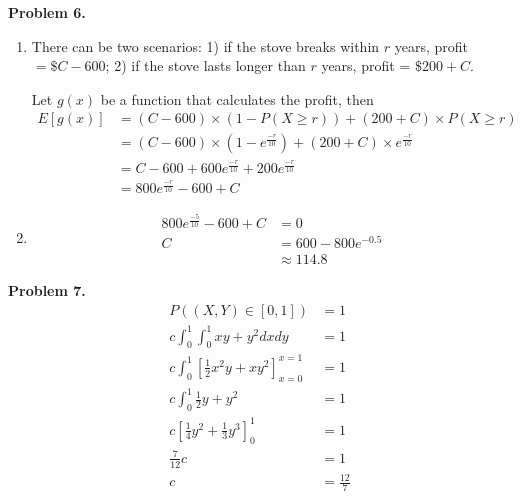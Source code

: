 \documentclass{article}
\begin{document}
\textbf{Problem 6.}
\begin{enumerate}[label={(\alph*)}]
    \item There can be two scenarios: 1) if the stove breaks within $r$ years, profit $ = \$C-600$; 2) if the stove lasts longer than $r$ years, profit = $\$200+C$.
    
    Let $g(x)$ be a function that calculates the profit, then 
    \begin{align}
        E[g(x)] & = (C-600) \times \left(1-P(X \ge r)\right)+(200+C)\times P(X\ge r) \\
        & = (C-600) \times (1 - e^{\frac{-r}{10}})+(200+C)\times e^{\frac{-r}{10}} \\
        & = C-600+600e^{\frac{-r}{10}}+200e^{\frac{-r}{10}} \\
        & = 800e^{\frac{-r}{10}}-600+C
    \end{align}

    \item 
    \begin{align}
        800e^{\frac{-5}{10}}-600+C & = 0 \\
        C & = 600 - 800e^{-0.5} \\
        & \approx 114.8
    \end{align}
\end{enumerate}
\bigbreak

\textbf{Problem 7.}
\begin{align}
    P((X,Y)\in [0,1])&=1 \\
    c\int_{0}^{1}\int_{0}^{1}xy+y^2dxdy & = 1 \\
    c\int_{0}^{1}\left[\frac{1}{2}x^2y+xy^2\right]_{x=0}^{x=1} & = 1 \\
    c\int_{0}^{1}\frac{1}{2}y+y^2& = 1 \\
    c\left[\frac{1}{4}y^2+\frac{1}{3}y^3\right]_0^1 & = 1 \\
    \frac{7}{12}c & = 1 \\
    c & = \frac{12}{7}
\end{align}
\end{document}
